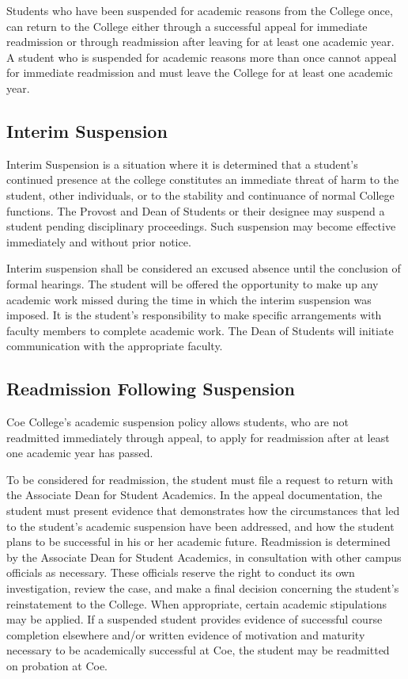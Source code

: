 \documentclass[
  letterpaper,
]{scrbook}
\begin{document}
Students who have been suspended for academic reasons from the College
once, can return to the College either through a successful appeal for
immediate readmission or through readmission after leaving for at least
one academic year. A student who is suspended for academic reasons more
than once cannot appeal for immediate readmission and must leave the
College for at least one academic year.

\subsection{Interim Suspension}\label{interim-suspension}

Interim Suspension is a situation where it is determined that a
student's continued presence at the college constitutes an immediate
threat of harm to the student, other individuals, or to the stability
and continuance of normal College functions. The Provost and Dean of
Students or their designee may suspend a student pending disciplinary
proceedings. Such suspension may become effective immediately and
without prior notice.

Interim suspension shall be considered an excused absence until the
conclusion of formal hearings. The student will be offered the
opportunity to make up any academic work missed during the time in which
the interim suspension was imposed. It is the student's responsibility
to make specific arrangements with faculty members to complete academic
work. The Dean of Students will initiate communication with the
appropriate faculty.

\subsection{Readmission Following
Suspension}\label{readmission-following-suspension}

Coe College's academic suspension policy allows students, who are not
readmitted immediately through appeal, to apply for readmission after at
least one academic year has passed.

To be considered for readmission, the student must file a request to
return with the Associate Dean for Student Academics. In the appeal
documentation, the student must present evidence that demonstrates how
the circumstances that led to the student's academic suspension have
been addressed, and how the student plans to be successful in his or her
academic future. Readmission is determined by the Associate Dean for
Student Academics, in consultation with other campus officials as
necessary. These officials reserve the right to conduct its own
investigation, review the case, and make a final decision concerning the
student's reinstatement to the College. When appropriate, certain
academic stipulations may be applied. If a suspended student provides
evidence of successful course completion elsewhere and/or written
evidence of motivation and maturity necessary to be academically
successful at Coe, the student may be readmitted on probation at Coe.
\end{document}
